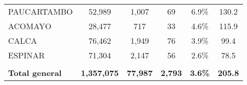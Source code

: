 \begin{tabular}{lccccc}
	\cellcolor[HTML]{FFE699}PAUCARTAMBO                             & 52,989               & 1,007                      & 69                   & 6.9\%                      & 130.2                                       \\
	\cellcolor[HTML]{FFE699}ACOMAYO                                 & 28,477               & 717                        & 33                   & 4.6\%                      & 115.9                                       \\
	\cellcolor[HTML]{FFE699}CALCA                                   & 76,462               & 1,949                      & 76                   & 3.9\%                      & 99.4                                        \\
	\cellcolor[HTML]{FFE699}ESPINAR                                 & 71,304               & 2,147                      & 56                   & 2.6\%                      & 78.5                                        \\
	& \multicolumn{1}{l}{} & \multicolumn{1}{l}{}       & \multicolumn{1}{l}{} & \multicolumn{1}{l}{}       & \multicolumn{1}{l}{}                        \\
	\rowcolor[HTML]{DDEBF7} 
	\textbf{Total general}                                          & \textbf{1,357,075}   & \textbf{77,987}            & \textbf{2,793}       & \textbf{3.6\%}             & \textbf{205.8}                             
\end{tabular}